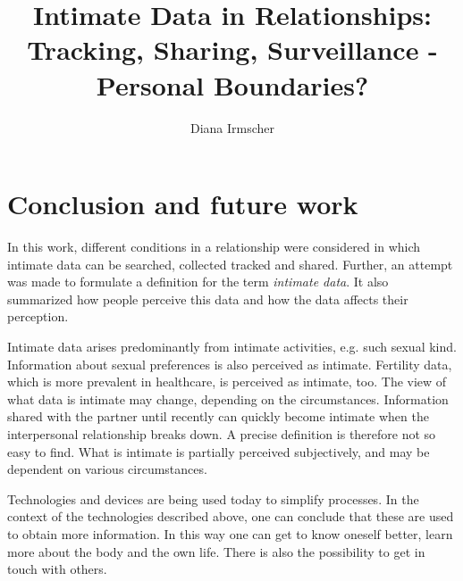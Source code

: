 \documentclass[journal]{vgtc}                %
\title{Intimate Data in Relationships: Tracking, Sharing, Surveillance - Personal Boundaries?}
\author{Diana Irmscher}
\begin{document}

\maketitle

%
%










%

\section{Conclusion and future work}
\label{sec:conculsion}
In this work, different conditions in a relationship  were considered in which intimate data can be searched, collected tracked and shared.
Further, an attempt was made to formulate a definition for the term \textit{intimate data}. It also summarized how people perceive this data and how the data affects their perception.

Intimate data arises predominantly from intimate activities, e.g. such sexual kind. Information about sexual preferences is also perceived as intimate. Fertility data, which is more prevalent in healthcare, is perceived as intimate, too. The view of what data is intimate may change, depending on the circumstances. Information shared with the partner until recently can quickly become intimate when the interpersonal relationship breaks down. A precise definition is therefore not so easy to find. What is intimate is partially perceived subjectively, and may be dependent on various circumstances.

Technologies and devices are being used today to simplify processes. In the context of the technologies described above, one can conclude that these are used to obtain more information. In this way one can get to know oneself better, learn more about the body and the  own life. There is also the possibility to get in touch with others.
\end{document}

